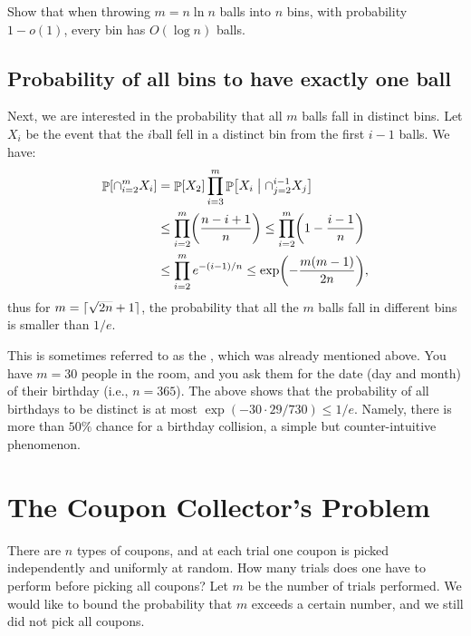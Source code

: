 \begin{exercise}
    Show that when throwing $m=n \ln n$ balls into $n$ bins, with
    probability $1 - o(1)$, every bin has $O(\log{n})$ balls.
\end{exercise}



\subsection{Probability of all bins to %
   have exactly one ball}

Next, we are interested in the probability that all $m$ balls fall in
distinct bins.  Let $X_i$ be the event that the $i$\th ball fell in a
distinct bin from the first $i-1$ balls. We have:
\begin{align*}
  \Prob{\cap_{i=2}^{m} X_i }%
  &=%
    \Prob{X_2} \prod_{i=3}^{m} \ProbCond{X_i}{ \cap_{j=2}^{i-1}
    X_j}%
    \\&
    \leq%
    \prod_{i=2}^{m} \pth{\frac{n-i + 1}{n}}%
    \leq%
    \prod_{i=2}^{m}\pth{ 1 - \frac{i-1}{n}}%
  \\&%
  \leq%
  \prod_{i=2}^{m} e^{- \nfrac{(i-1)}{n}}%
  \leq%
  \exp \pth{ - \frac{m(m-1)}{2n} },
\end{align*}
thus for $m=\left\lceil {\smash{\sqrt{2n}} + 1} \right\rceil$, the probability that all
the $m$ balls fall in different bins is smaller than $1/e$.

This is sometimes referred to as the , which was
already mentioned above. You have $m=30$ people in the room, and you ask
them for the date (day and month) of their birthday (i.e., $n=365$). The
above shows that the probability of all birthdays to be distinct is at
most $\exp( -30\cdot 29/730 ) \leq 1/e$. Namely, there is more than
$50\%$ chance for a birthday collision, a simple but counter-intuitive
phenomenon.

\section{The Coupon Collector's Problem}

There are $n$ types of coupons, and at each trial one coupon is picked
independently and uniformly at random. How many trials does one have to
perform before picking all coupons?  Let $m$ be the number of trials
performed. We would like to bound the probability that $m$ exceeds a
certain number, and we still did not pick all coupons.

